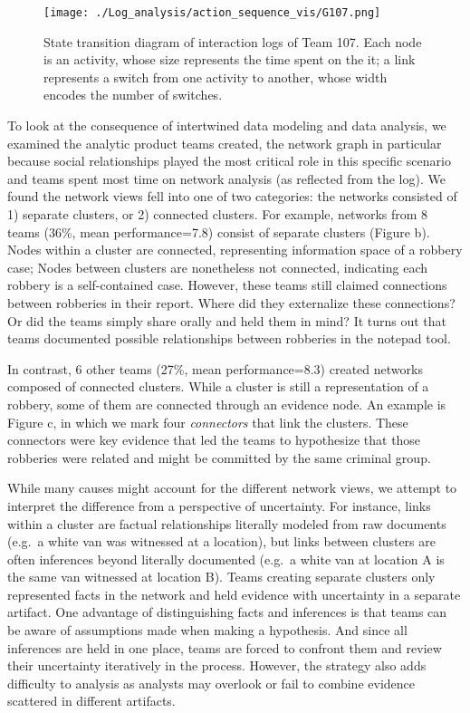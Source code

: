\begin{figure}
	\centering
	\texttt{[image: ./Log\_analysis/action\_sequence\_vis/G107.png]}
	\caption{State transition diagram of interaction logs of Team 107. Each
		node is an activity, whose size represents the time spent on the it; a
		link represents a switch from one activity to another, whose width
		encodes the number of switches.}\label{fig:sequence}
\end{figure}

To look at the consequence of intertwined data modeling and data
analysis, we examined the analytic product teams created, the network
graph in particular because social relationships played the most
critical role in this specific scenario and teams spent most time on
network analysis (as reflected from the log). We found the network views
fell into one of two categories: the networks consisted of 1) separate
clusters, or 2) connected clusters. For example, networks from 8 teams
(36\%, mean performance=7.8) consist of separate clusters (Figure
\autocite{fig:network}b). Nodes within a cluster are connected,
representing information space of a robbery case; Nodes between clusters
are nonetheless not connected, indicating each robbery is a
self-contained case. However, these teams still claimed connections
between robberies in their report. Where did they externalize these
connections? Or did the teams simply share orally and held them in mind?
It turns out that teams documented possible relationships between
robberies in the notepad tool.

In contrast, 6 other teams (27\%, mean performance=8.3) created networks
composed of connected clusters. While a cluster is still a
representation of a robbery, some of them are connected through an
evidence node. An example is Figure \autocite{fig:network}c, in which we
mark four \emph{connectors} that link the clusters. These connectors
were key evidence that led the teams to hypothesize that those robberies
were related and might be committed by the same criminal group.

While many causes might account for the different network views, we
attempt to interpret the difference from a perspective of uncertainty.
For instance, links within a cluster are factual relationships literally
modeled from raw documents (e.g.~a white van was witnessed at a
location), but links between clusters are often inferences beyond
literally documented (e.g.~a white van at location A is the same van
witnessed at location B). Teams creating separate clusters only
represented facts in the network and held evidence with uncertainty in a
separate artifact. One advantage of distinguishing facts and inferences
is that teams can be aware of assumptions made when making a hypothesis.
And since all inferences are held in one place, teams are forced to
confront them and review their uncertainty iteratively in the process.
However, the strategy also adds difficulty to analysis as analysts may
overlook or fail to combine evidence scattered in different artifacts.

